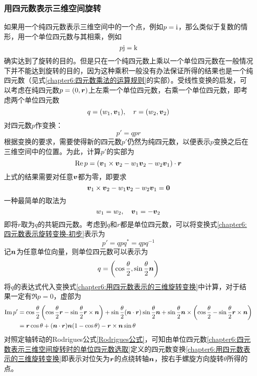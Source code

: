 \subsubsection{用四元数表示三维空间旋转}

如果用一个纯四元数表示三维空间中的一个点，例如$p=\mathrm{i}$，那么类似于复数的情形，用一个单位四元数与其相乘，例如
\begin{equation*}
	p\mathrm{j} = \mathrm{k}
\end{equation*}
确实达到了旋转的目的。但是只在一个纯四元数上乘以一个单位四元数在一般情况下并不能达到旋转的目的，因为这种乘积一般没有办法保证所得的结果也是一个纯四元数（见式\eqref{chapter6:四元数乘法的运算规则}的实部）。受线性变换的启发，可以考虑在纯四元数$p=(0,\boldsymbol{r})$上左乘一个单位四元数，右乘一个单位四元数，即考虑两个单位四元数
\begin{equation}
	q = (w_1,\boldsymbol{v}_1),\quad r = (w_2,\boldsymbol{v}_2)
\end{equation}
对四元数$p$作变换：
\begin{equation}
	p' = qpr
	\label{chapter6:四元数表示旋转变换-初步}
\end{equation}
根据变换的要求，需要使得新的四元数$p'$仍然为纯四元数，以便表示$p$变换之后在三维空间中的位置。为此，计算$p'$的实部为
\begin{equation}
	\mathrm{Re}\, p = (\boldsymbol{v}_1\times \boldsymbol{v}_2-w_1\boldsymbol{v}_2-w_2\boldsymbol{v}_1)\cdot \boldsymbol{r}
\end{equation}
上式的结果需要对任意$\boldsymbol{v}$都为零，即要求
\begin{equation}
	\boldsymbol{v}_1\times \boldsymbol{v}_2-w_1\boldsymbol{v}_2-w_2\boldsymbol{v}_1 = \boldsymbol{0}
\end{equation}
一种最简单的取法为
\begin{equation}
	w_1=w_2,\quad \boldsymbol{v}_1=-\boldsymbol{v}_2
\end{equation}
即将$r$取为$q$的共轭四元数。考虑到$q$和$r$都是单位四元数，可以将变换式\eqref{chapter6:四元数表示旋转变换-初步}表示为
\begin{equation}
	p' = qpq^* = qpq^{-1}
	\label{chapter6:用四元数表示的三维旋转变换}
\end{equation}
记$\boldsymbol{n}$为任意单位向量，则单位四元数可以表示为
\begin{equation}
	q = \left(\cos\frac{\theta}{2},\sin\frac{\theta}{2}\boldsymbol{n}\right)
	\label{chapter6:四元数表示三维空间旋转时的单位四元数选取}
\end{equation}
将$q$的表达式代入变换式\eqref{chapter6:用四元数表示的三维旋转变换}中计算，对于结果一定有$\Re p = 0$，虚部为
\begin{align}
	\mathrm{Im}\, p' & = \cos\frac{\theta}{2}\left(\cos\frac{\theta}{2}\boldsymbol{r}-\sin\frac{\theta}{2}\boldsymbol{r}\times \boldsymbol{n}\right) + \sin\frac{\theta}{2} (\boldsymbol{n}\cdot \boldsymbol{r}) \sin\frac{\theta}{2}\boldsymbol{n} + \sin\frac{\theta}{2}\boldsymbol{n} \times \left(\cos\frac{\theta}{2}-\sin\frac{\theta}{2}\boldsymbol{r}\times \boldsymbol{n}\right) \nonumber \\
	& = \boldsymbol{r}\cos\theta + (\boldsymbol{n}\cdot \boldsymbol{r})\boldsymbol{n}(1-\cos\theta) - \boldsymbol{r}\times \boldsymbol{n}\sin\theta
\end{align}
对照定轴转动的Rodrigues公式\eqref{Rodrigues公式}，可知由单位四元数\eqref{chapter6:四元数表示三维空间旋转时的单位四元数选取}定义的四元数变换\eqref{chapter6:用四元数表示的三维旋转变换}即表示对位矢为$\boldsymbol{r}$的点绕转轴$\boldsymbol{n}$，按右手螺旋方向旋转$\theta$所得的点。

